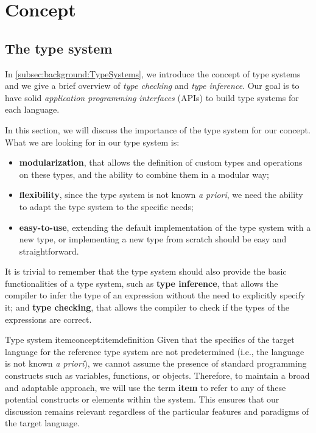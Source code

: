 \chapter{Concept}\label{chap:Concept}

\section{The type system}\label{sec:concept:TheTypeSystem}

In \ref{subsec:background:TypeSystems}, we introduce the concept of type systems and we give a brief overview of \textit{type checking} and \textit{type inference}. Our goal is to have solid \textit{application programming interfaces} (APIs) to build type systems for each language.

In this section, we will discuss the importance of the type system for our concept.
What we are looking for in our type system is:
\begin{itemize}
    \item \textbf{modularization}, that allows the definition of custom types and operations on these types, and the ability to combine them in a modular way;
    \item \textbf{flexibility}, since the type system is not known \textit{a priori}, we need the ability to adapt the type system to the specific needs;
    \item \textbf{easy-to-use}, extending the default implementation of the type system with a new type, or implementing a new type from scratch should be easy and straightforward.
\end{itemize}

It is trivial to remember that the type system should also provide the basic functionalities of a type system, such as \textbf{type inference}, that allows the compiler to infer the type of an expression without the need to explicitly specify it; and \textbf{type checking}, that allows the compiler to check if the types of the expressions are correct.


\begin{mydefinition}{Type system item}{concept:itemdefinition}
    Given that the specifics of the target language for the reference type system are not predetermined (i.e., the language is not known \textit{a priori}), we cannot assume the presence of standard programming constructs such as variables, functions, or objects. Therefore, to maintain a broad and adaptable approach, we will use the term \textbf{item} to refer to any of these potential constructs or elements within the system. This ensures that our discussion remains relevant regardless of the particular features and paradigms of the target language.
\end{mydefinition}


